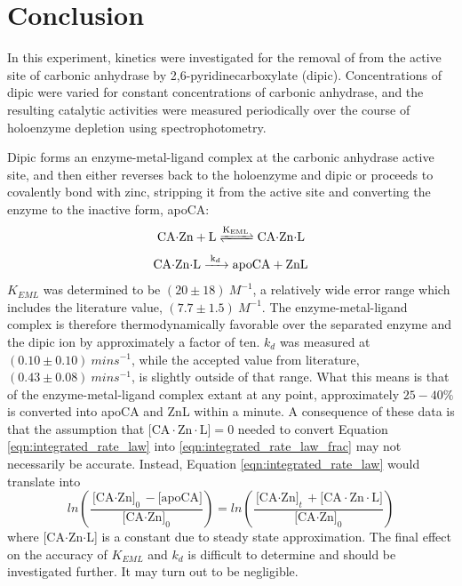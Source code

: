 \section{Conclusion}
In this experiment, kinetics were investigated for the removal of  from the active site of carbonic anhydrase by 2,6-pyridinecarboxylate (dipic). Concentrations of dipic were varied for constant concentrations of carbonic anhydrase, and the resulting catalytic activities were measured periodically over the course of holoenzyme depletion using spectrophotometry.

Dipic forms an enzyme-metal-ligand complex at the carbonic anhydrase active site, and then either reverses back to the holoenzyme and dipic or proceeds to covalently bond with zinc, stripping it from the active site and converting the enzyme to the inactive form, apoCA:
\begin{align*}
\ce{CA$\cdot$Zn + L
<=>[\ce{K_{EML}}]
CA$\cdot$Zn$\cdot$L}
\end{align*}
\begin{align*}\label{eqn:kd_reaction}
\ce{CA$\cdot$Zn$\cdot$L
->[\ce{k_{d}}]
apoCA + ZnL}
\end{align*}
$K_{EML}$ was determined to be $(20\pm{18}){\ }M^{-1}$, a relatively wide error range which includes the literature value, $(7.7\pm{1.5}){\ }M^{-1}$\cite{bib:easy_peasy_values}. The enzyme-metal-ligand complex is therefore thermodynamically favorable over the separated enzyme and the dipic ion by approximately a factor of ten. $k_{d}$ was measured at $(0.10\pm{0.10}){\ }mins^{-1}$, while the accepted value from literature, $(0.43\pm{0.08}){\ }mins^{-1}$, is slightly outside of that range. What this means is that of the enzyme-metal-ligand complex extant at any point, approximately $25-40\%$ is converted into apoCA and ZnL within a minute. A consequence of these data is that the assumption that $\text{[CA$\cdot$Zn$\cdot$L]}=0$ needed to convert Equation \eqref{eqn:integrated_rate_law} into \eqref{eqn:integrated_rate_law_frac} may not necessarily be accurate. Instead, Equation \eqref{eqn:integrated_rate_law} would translate into
\begin{equation}\label{eqn:integrated_rate_law}
ln \left( \frac{\text{[CA$\cdot$Zn]}_0 - \text{[apoCA]}}{\text{[CA$\cdot$Zn]}_0} \right)
=
ln \left( \frac{\text{[CA$\cdot$Zn]}_t + \text{[CA$\cdot$Zn$\cdot$L]}}{\text{[CA$\cdot$Zn]}_0} \right)
\end{equation}
where [CA$\cdot$Zn$\cdot$L] is a constant due to steady state approximation. The final effect on the accuracy of $K_{EML}$ and $k_{d}$ is difficult to determine and should be investigated further. It may turn out to be negligible.

